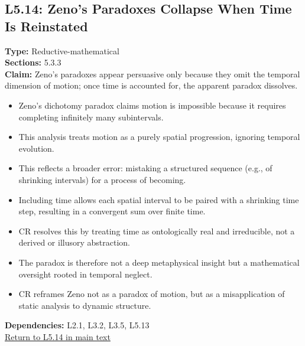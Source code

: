 \documentclass[12pt]{book}
\newcommand{\returnlink}[1]{\hyperref[logic:#1]{Return to #1 in main text}\xspace}
\begin{document}
\subsection*{L5.14: Zeno's Paradoxes Collapse When Time Is Reinstated}
\label{appendix:L5.14}
\textbf{Type:} Reductive-mathematical \\
\textbf{Sections:} 5.3.3 \\
\textbf{Claim:} Zeno's paradoxes appear persuasive only because they omit the temporal dimension of motion; once time is accounted for, the apparent paradox dissolves.
\begin{itemize}
  \item Zeno's dichotomy paradox claims motion is impossible because it requires completing infinitely many subintervals.
  \item This analysis treats motion as a purely spatial progression, ignoring temporal evolution.
  \item This reflects a broader error: mistaking a structured sequence (e.g., of shrinking intervals) for a process of becoming. 
  \item Including time allows each spatial interval to be paired with a shrinking time step, resulting in a convergent sum over finite time.
  \item CR resolves this by treating time as ontologically real and irreducible, not a derived or illusory abstraction.
  \item The paradox is therefore not a deep metaphysical insight but a mathematical oversight rooted in temporal neglect.
  \item CR reframes Zeno not as a paradox of motion, but as a misapplication of static analysis to dynamic structure.
\end{itemize}
\textbf{Dependencies:} L2.1, L3.2, L3.5, L5.13 \\
\returnlink{L5.14}
\end{document}
